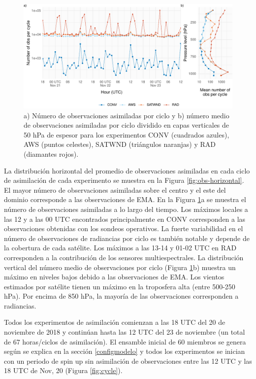 \documentclass[12pt,oneside,a4paper]{reedthesis}
\begin{document}
\begin{figure}
\includegraphics{thesis_files/figure-latex/obs-cycle-1} \caption{a) Número de observaciones asimiladas por ciclo y b) número medio de observaciones asimiladas por ciclo dividido en capas verticales de 50 hPa de espesor para los experimentos CONV (cuadrados azules), AWS (puntos celestes), SATWND (triángulos naranjas) y RAD (diamantes rojos).}\label{fig:obs-cycle}
\end{figure}
La distribución horizontal del promedio de observaciones asimiladas en cada ciclo de asimilación de cada experimento se muestra en la Figura \ref{fig:obs-horizontal}. El mayor número de observaciones asimiladas sobre el centro y el este del dominio corresponde a las observaciones de EMA. En la Figura \ref{fig:obs-cycle}a se muestra el número de observaciones asimiladas a lo largo del tiempo. Los máximos locales a las 12 y a las 00 UTC encontrados principalmente en CONV corresponden a las observaciones obtenidas con los sondeos operativos. La fuerte variabilidad en el número de observaciones de radiancias por ciclo es también notable y depende de la cobertura de cada satélite. Los máximos a las 13-14 y 01-02 UTC en RAD corresponden a la contribución de los sensores multiespectrales. La distribución vertical del número medio de observaciones por ciclo (Figura \ref{fig:obs-cycle}b) muestra un máximo en niveles bajos debido a las observaciones de EMA. Los vientos estimados por satélite tienen un máximo en la troposfera alta (entre 500-250 hPa). Por encima de 850 hPa, la mayoría de las observaciones corresponden a radiancias.

Todos los experimentos de asimilación comienzan a las 18 UTC del 20 de noviembre de 2018 y continúan hasta las 12 UTC del 23 de noviembre (un total de 67 horas/ciclos de asimilación). El ensamble inicial de 60 miembros se genera según se explica en la sección \ref{configmodelo} y todos los experimentos se inician con un periodo de spin up sin asimilación de observaciones entre las 12 UTC y las 18 UTC de Nov, 20 (Figura \ref{fig:cycle}).
\end{document}

